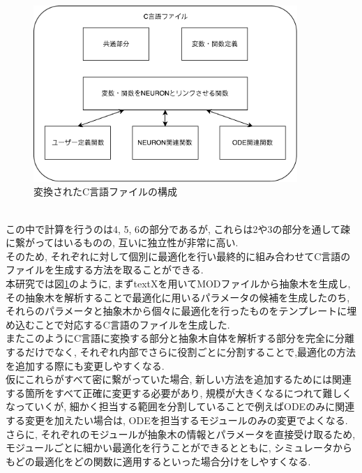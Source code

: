 \begin{figure}[htb]
  \begin{center}
    \includegraphics[width=10.0cm]{./images/transpiler-c-file.pdf}
    \caption{変換されたC言語ファイルの構成}
    \label{fig:transpiler}
  \end{center}
\end{figure}~\\

この中で計算を行うのは4, 5, 6の部分であるが, これらは2や3の部分を通して疎に繋がってはいるものの,
互いに独立性が非常に高い.\\
そのため, それぞれに対して個別に最適化を行い最終的に組み合わせてC言語のファイルを生成する方法を取ることができる.\\
本研究では図\ref{fig:transpiler}のように, まずtextXを用いてMODファイルから抽象木を生成し,
その抽象木を解析することで最適化に用いるパラメータの候補を生成したのち,
それらのパラメータと抽象木から個々に最適化を行ったものをテンプレートに埋め込むことで対応するC言語のファイルを生成した.\\

またこのようにC言語に変換する部分と抽象木自体を解析する部分を完全に分離するだけでなく,
それぞれ内部でさらに役割ごとに分割することで,最適化の方法を追加する際にも変更しやすくなる.\\
仮にこれらがすべて密に繋がっていた場合, 新しい方法を追加するためには関連する箇所をすべて正確に変更する必要があり,
規模が大きくなるにつれて難しくなっていくが, 細かく担当する範囲を分割していることで例えばODEのみに関連する変更を加えたい場合は,
ODEを担当するモジュールのみの変更でよくなる.\\
さらに, それぞれのモジュールが抽象木の情報とパラメータを直接受け取るため, モジュールごとに細かい最適化を行うことができるとともに,
シミュレータからもどの最適化をどの関数に適用するといった場合分けをしやすくなる.\\

